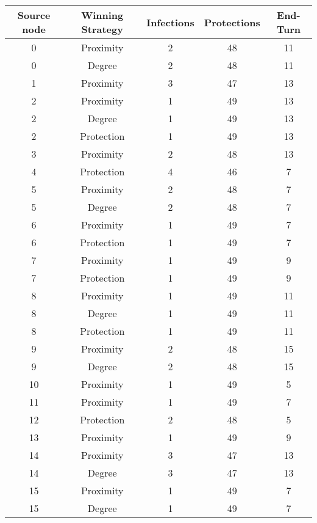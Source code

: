 \documentclass[results.tex]{subfiles}
\begin{document}
\begin{center}
  \begin{tabular}{| c || c | c | c | c |}
    \hline
    {\bfseries Source node} & {\bfseries Winning Strategy} & {\bfseries Infections} & {\bfseries Protections} & {\bfseries End-Turn} \\  %
    \hline\hline
    0 & Proximity & 2 & 48 & 11 \\ 
    \hline
    0 & Degree & 2 & 48 & 11 \\ 
    \hline
    1 & Proximity & 3 & 47 & 13 \\ 
    \hline
    2 & Proximity & 1 & 49 & 13 \\ 
    \hline
    2 & Degree & 1 & 49 & 13 \\ 
    \hline
    2 & Protection & 1 & 49 & 13 \\ 
    \hline
    3 & Proximity & 2 & 48 & 13 \\ 
    \hline
    4 & Protection & 4 & 46 & 7 \\ 
    \hline
    5 & Proximity & 2 & 48 & 7 \\ 
    \hline
    5 & Degree & 2 & 48 & 7 \\ 
    \hline
    6 & Proximity & 1 & 49 & 7 \\ 
    \hline
    6 & Protection & 1 & 49 & 7 \\ 
    \hline
    7 & Proximity & 1 & 49 & 9 \\ 
    \hline
    7 & Protection & 1 & 49 & 9 \\ 
    \hline
    8 & Proximity & 1 & 49 & 11 \\ 
    \hline
    8 & Degree & 1 & 49 & 11 \\ 
    \hline
    8 & Protection & 1 & 49 & 11 \\ 
    \hline
    9 & Proximity & 2 & 48 & 15 \\ 
    \hline
    9 & Degree & 2 & 48 & 15 \\ 
    \hline
    10 & Proximity & 1 & 49 & 5 \\ 
    \hline
    11 & Proximity & 1 & 49 & 7 \\ 
    \hline
    12 & Protection & 2 & 48 & 5 \\ 
    \hline
    13 & Proximity & 1 & 49 & 9 \\ 
    \hline
    14 & Proximity & 3 & 47 & 13 \\ 
    \hline
    14 & Degree & 3 & 47 & 13 \\ 
    \hline
    15 & Proximity & 1 & 49 & 7 \\ 
    \hline
    15 & Degree & 1 & 49 & 7 \\ 

\end{tabular}
\end{center}
\end{document}
